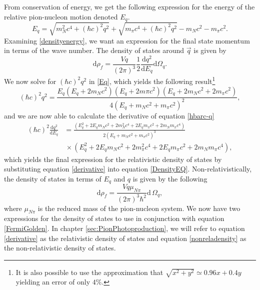 From conservation of energy, we get the following expression for the energy of the relative pion-nucleon motion denoted $E_q$. 
\begin{equation} \label{Eq}
	E_q = \sqrt{m_N^2 c^4+(\hbar c)^2q^2} + \sqrt{m_\pi c^4+(\hbar c)^2 q^2}-m_N c^2-m_\pi c^2.
\end{equation}
Examining \eqref{densityenergy}, we want an expression for the final state momentum in terms of the wave number. The density of states around $\vec{q}$ is given by
\begin{equation} \label{DensityEQ}
	\text{d}\rho_f = \frac{Vq}{(2\pi)^3}\frac{1}{2}\frac{\text{d}q^2}{\text{d}E_q} \text{d}\Omega_q.
\end{equation}
We now solve for $(\hbar c)^2q^2$ in \eqref{Eq}, which yields the following result\footnote{It is also possible to use the approximation that $\sqrt{x^2+y^2}\simeq 0.96x+0.4y$ yielding an error of only $4\%$.}
\begin{equation} \label{hbarc-q}
	(\hbar c)^2 q^2 = \frac{E_q(E_q+2m_N c^2)(E_q+2m\pi c^2)(E_q+2m_N c^2+2m_\pi c^2)}{4(E_q+m_N c^2+m_\pi c^2)^2},
\end{equation}
and we are now able to calculate the derivative of equation \eqref{hbarc-q}
\begin{equation}\begin{split} \label{derivative}
		(\hbar c)^2\frac{\text{d}q^2}{\text{d}E_q} &= \frac{(E_q^2+2E_q m_N c^2+2m_N^2 c^4+2E_q m_\pi c^2+2m_N m_\pi c^4)}{2(E_q+m_N c^2+m_\pi c^2)^3} \\
		& \, \times (E_q^2+2E_q m_N c^2 +2m_\pi^2 c^4 +2E_q m_\pi c^2+2m_N m_\pi c^4),
	\end{split}
\end{equation} 
which yields the final expression for the relativistic density of states by substituting equation \eqref{derivative} into equation \eqref{DensityEQ}. Non-relativistically, the density of states in terms of $E_q$ and $q$ is given by the following 
\begin{equation}\label{nonreladensity}
	\text{d}\rho_f = \frac{Vq\mu_{N\pi}}{(2\pi)^3\hbar^2} \text{d}\,\Omega_q,
\end{equation}
where $\mu_{N\pi}$ is the reduced mass of the pion-nucleon system. We now have two expressions for the density of states to use in conjunction with equation \eqref{FermiGolden}. In chapter \ref{sec:PionPhotoproduction}, we will refer to equation \eqref{derivative} as the relativistic density of states and equation \eqref{nonreladensity} as the non-relativistic density of states.
\clearpage
\thispagestyle{empty}\mbox{}
\clearpage
